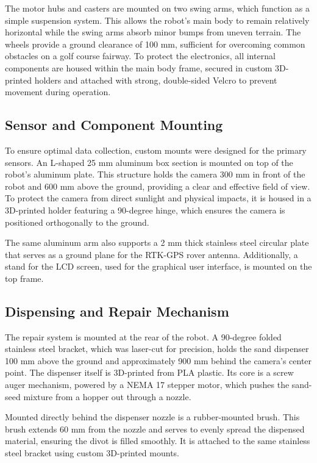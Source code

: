 The motor hubs and casters are mounted on two swing arms, which function as a simple suspension system. This allows the robot's main body to remain relatively horizontal while the swing arms absorb minor bumps from uneven terrain. The wheels provide a ground clearance of 100 mm, sufficient for overcoming common obstacles on a golf course fairway. To protect the electronics, all internal components are housed within the main body frame, secured in custom 3D-printed holders and attached with strong, double-sided Velcro to prevent movement during operation.

\subsection{Sensor and Component Mounting}
\label{ssec:sensor_mounting}
To ensure optimal data collection, custom mounts were designed for the primary sensors. An L-shaped 25 mm aluminum box section is mounted on top of the robot's aluminum plate. This structure holds the camera 300 mm in front of the robot and 600 mm above the ground, providing a clear and effective field of view. To protect the camera from direct sunlight and physical impacts, it is housed in a 3D-printed holder featuring a 90-degree hinge, which ensures the camera is positioned orthogonally to the ground.

The same aluminum arm also supports a 2 mm thick stainless steel circular plate that serves as a ground plane for the RTK-GPS rover antenna. Additionally, a stand for the LCD screen, used for the graphical user interface, is mounted on the top frame.

\subsection{Dispensing and Repair Mechanism}
\label{ssec:dispenser_mechanism}
The repair system is mounted at the rear of the robot. A 90-degree folded stainless steel bracket, which was laser-cut for precision, holds the sand dispenser 100 mm above the ground and approximately 900 mm behind the camera's center point. The dispenser itself is 3D-printed from PLA plastic. Its core is a screw auger mechanism, powered by a NEMA 17 stepper motor, which pushes the sand-seed mixture from a hopper out through a nozzle.

Mounted directly behind the dispenser nozzle is a rubber-mounted brush. This brush extends 60 mm from the nozzle and serves to evenly spread the dispensed material, ensuring the divot is filled smoothly. It is attached to the same stainless steel bracket using custom 3D-printed mounts.

